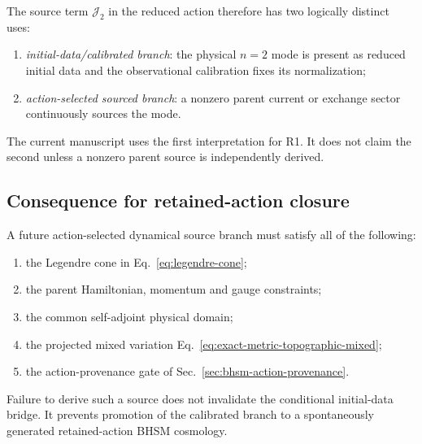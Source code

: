 The source term $\mathcal J_2$ in the reduced action therefore has two
logically distinct uses:

\begin{enumerate}
\item \emph{initial-data/calibrated branch}: the physical $n=2$ mode is
      present as reduced initial data and the observational calibration fixes
      its normalization;
\item \emph{action-selected sourced branch}: a nonzero parent current or
      exchange sector continuously sources the mode.
\end{enumerate}

The current manuscript uses the first interpretation for R1.  It does not
claim the second unless a nonzero parent source is independently derived.

\subsection{Consequence for retained-action closure}

A future action-selected dynamical source branch must satisfy all of the
following:

\begin{enumerate}
\item the Legendre cone in Eq.~\eqref{eq:legendre-cone};
\item the parent Hamiltonian, momentum and gauge constraints;
\item the common self-adjoint physical domain;
\item the projected mixed variation
      Eq.~\eqref{eq:exact-metric-topographic-mixed};
\item the action-provenance gate of
      Sec.~\ref{sec:bhsm-action-provenance}.
\end{enumerate}

Failure to derive such a source does not invalidate the conditional
initial-data bridge.  It prevents promotion of the calibrated branch to a
spontaneously generated retained-action BHSM cosmology.
